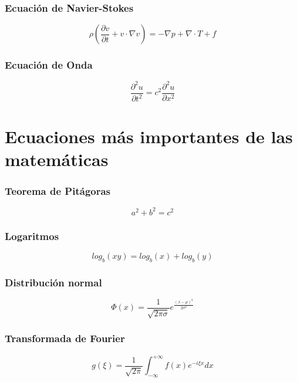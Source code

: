 \documentclass[10pt,a4paper]{article}
\begin{document}
\subsubsection*{Ecuación de Navier-Stokes}
\begin{equation}
\rho (\frac{\partial v}{\partial t} + v \cdot \nabla v ) = - \nabla p + \nabla \cdot T + f
\end{equation}


\subsubsection*{Ecuación de Onda}
\begin{equation}
\frac{\partial ^2 u}{\partial t^2} = c^2 \frac{\partial ^2 u}{\partial x^2}
\end{equation}



\section*{Ecuaciones más importantes de las matemáticas}


\subsubsection*{Teorema de Pitágoras}
\begin{equation}
a^2 + b^2 = c^2
\end{equation}


\subsubsection*{Logaritmos}
\begin{equation}
log_b(x y) = log_b(x) +log_b(y) 
\end{equation}


\subsubsection*{Distribución normal}
\begin{equation}
\Phi (x) = \frac{1}{\sqrt{2 \pi \sigma}} e^{\frac{(x- \mu)^2}{2 \sigma ^2}}
\end{equation}


\subsubsection*{Transformada de Fourier}
\begin{equation}
g(\xi)= \frac{1}{\sqrt{2 \pi}} \int_{- \infty}^{+ \infty} f(x) e^{- i \xi x} dx
\end{equation}
\end{document}
